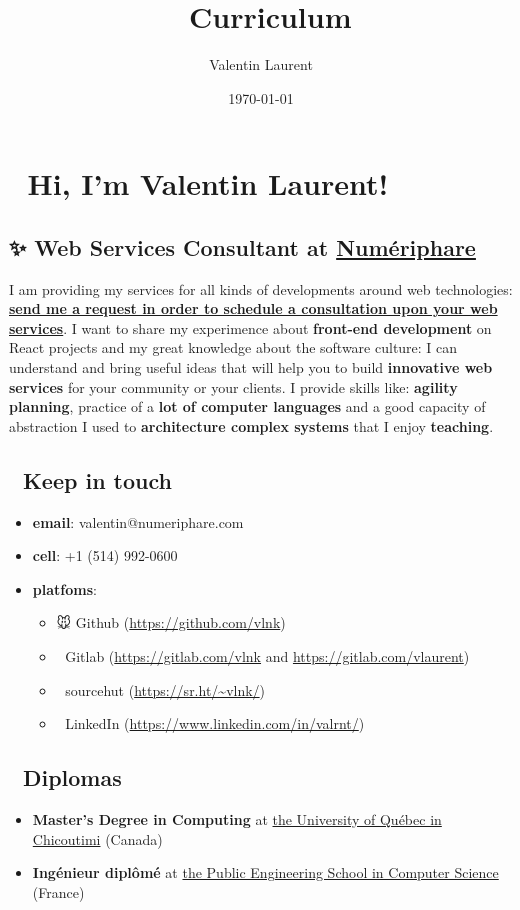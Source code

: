 \documentclass[11pt]{article}
\author{Valentin Laurent}
\date{\today}
\title{👔 Curriculum}
\begin{document}
\maketitle
\section{👋 Hi, I'm Valentin Laurent!}
\label{sec:org3fb9316}
\subsection{✨ \textbf{Web Services Consultant} at \href{https://www.numeriphare.com/}{Numériphare}}
\label{sec:org59d0455}
I am providing my services for all kinds of developments around web technologies: \textbf{\href{https://framaforms.org/numeriphare-contact-en-1666988238}{send me a request in order to schedule a consultation upon your web services}}. I want to share my experimence about \textbf{front-end development} on React projects and my great knowledge about the software culture: I can understand and bring useful ideas that will help you to build \textbf{innovative web services} for your community or your clients. I provide skills like: \textbf{agility planning}, practice of a \textbf{lot of computer languages} and a good capacity of abstraction I used to \textbf{architecture complex systems} that I enjoy \textbf{teaching}.

\subsection{📇 Keep in touch}
\label{sec:org3661a9e}
\begin{itemize}
\item \textbf{email}: valentin@numeriphare.com
\item \textbf{cell}: +1 (514) 992-0600
\item \textbf{platfoms}:
\begin{itemize}
\item 🐭 Github (\url{https://github.com/vlnk})
\item 🚀 Gitlab (\url{https://gitlab.com/vlnk} and \url{https://gitlab.com/vlaurent})
\item 🌲 sourcehut (\url{https://sr.ht/\~vlnk/})
\item 👞 LinkedIn (\url{https://www.linkedin.com/in/valrnt/})
\end{itemize}
\end{itemize}

\subsection{🏫 Diplomas}
\label{sec:orgcb43da2}
\begin{itemize}
\item \textbf{Master's Degree in Computing} at \href{https://www.linkedin.com/school/choisiruqac/}{the University of Québec in Chicoutimi} (Canada)
\item \textbf{Ingénieur diplômé} at \href{https://www.clermont-auvergne-inp.fr/ecoles/isima/}{the Public Engineering School in Computer Science} (France)
\end{itemize}
\end{document}
